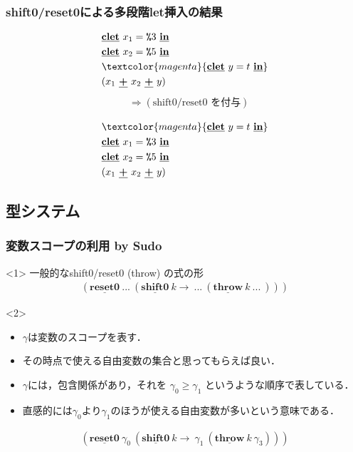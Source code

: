 \documentclass[dvipdfmx,cjk,xcolor=dvipsnames,envcountsect,notheorems,12pt]{beamer}
\newcommand\cResetz{\underline{\textbf{reset0}}}
\newcommand\cShiftz{\underline{\textbf{shift0}}}
\newcommand\cThrow{\underline{\textbf{throw}}}
\newcommand\cPlus{\underline{\textbf{+}}}
\newcommand\cLet{\underline{\textbf{clet}}}
\newcommand\cIn{\underline{\textbf{in}}}
\newcommand\csp[1]{\texttt{\%}{#1}}
\newcommand\ord{\ge}
\newcommand\magenta[1]{\textcolor{magenta}{#1}}
\theoremstyle{definition}
\begin{document}
\begin{frame}
  \frametitle{shift0/reset0による多段階let挿入の結果}
  \begin{align*}
    & \cLet~x_1=\csp{3}~\cIn \\
    & \cLet~x_2=\csp{5}~\cIn \\
    & \magenta{\cLet~y=t~\cIn} \\
    & (x_1~\cPlus~x_2~\cPlus~y)
  \end{align*}
  \pause
  \begin{align*}
    & \Rightarrow (\text{shift0/reset0 を付与})\\
  \end{align*}
  \pause
  \begin{align*}
    & \magenta{\cLet~y=t~\cIn} \\
    & \cLet~x_1=\csp{3}~\cIn \\
    & \cLet~x_2=\csp{5}~\cIn \\
    & (x_1~\cPlus~x_2~\cPlus~y)
  \end{align*}
\end{frame}

\subsection{型システム}
\begin{frame}
  \frametitle{変数スコープの利用 by Sudo}
  \begin{onlyenv}<1>
    一般的なshift0/reset0 (throw) の式の形
    \begin{align*}
      (\cResetz ~...~ (\cShiftz ~k \to ~...~ (\cThrow ~k ~...~)))
    \end{align*}
  \end{onlyenv}

  \begin{onlyenv}<2>
    \begin{itemize}
    \item $\gamma$は変数のスコープを表す．
    \item その時点で使える自由変数の集合と思ってもらえば良い．
    \item $\gamma$には，包含関係があり，それを $\gamma_0 \ord \gamma_1$ というような順序で表している．
    \item 直感的には$\gamma_0$より$\gamma_1$のほうが使える自由変数が多いという意味である．
    \end{itemize}

    \begin{align*}
      (\cResetz ~\gamma_0~ (\cShiftz ~k \to ~\gamma_1~ (\cThrow ~k ~\gamma_3)))
    \end{align*}
  \end{onlyenv}
\end{frame}
\end{document}
